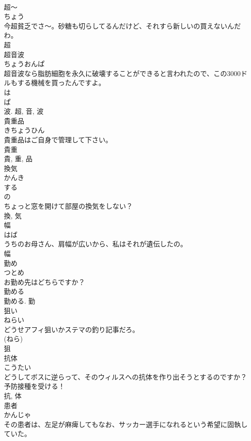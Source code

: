 \documentclass[8pt]{extreport}
\begin{document}
\begin{CJK}{UTF8}{min}
\\	超〜	
\\	ちょう	
\\	今超貧乏でさ〜。砂糖も切らしてるんだけど、それすら新しいの買えないんだわ。	
\\	超	
\\	超音波	
\\	ちょうおんぱ	
\\	超音波なら脂肪細胞を永久に破壊することができると言われたので、この3000ドルもする機械を買ったんですよ。	
\\	は 
\\	ぱ 
\\	波.	超, 音, 波	
\\	貴重品	
\\	きちょうひん	
\\	貴重品はご自身で管理して下さい。	
\\	貴重 
\\	貴, 重, 品	
\\	換気	
\\	かんき	
\\	する 
\\	の 
\\	ちょっと窓を開けて部屋の換気をしない？	
\\	換, 気	
\\	幅	
\\	はば	
\\	うちのお母さん、肩幅が広いから、私はそれが遺伝したの。	
\\	幅	
\\	勤め	
\\	つとめ	
\\	お勤め先はどちらですか？	
\\	勤める 
\\	勤める.	勤	
\\	狙い	
\\	ねらい	
\\	どうせアフィ狙いかステマの釣り記事だろ。	
\\	(ねら) 
\\	狙	
\\	抗体	
\\	こうたい	
\\	どうしてボスに逆らって、そのウィルスへの抗体を作り出そうとするのですか？予防接種を受ける！	
\\	抗, 体	
\\	患者	
\\	かんじゃ	
\\	その患者は、左足が麻痺してもなお、サッカー選手になれるという希望に固執していた。	

\end{CJK}
\end{document}
